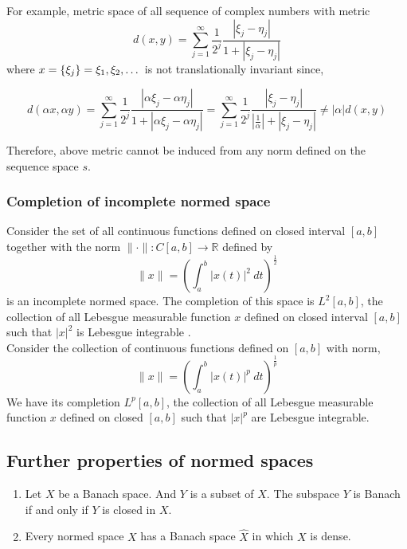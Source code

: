 	For example, metric space of all sequence of complex numbers with metric
	\[ d(x,y) = \sum_{j = 1}^\infty \frac{1}{2^j} \frac{|\xi_j-\eta_j|}{1+|\xi_j-\eta_j|} \]
	where $x = \left\{\xi_j\right\} = \xi_1,\xi_2,\dotsc$ is not translationally invariant since,

	\[ d(\alpha x, \alpha y) = \sum_{j = 1}^\infty \frac{1}{2^j} \frac{|\alpha\xi_j-\alpha\eta_j|}{1+|\alpha\xi_j - \alpha\eta_j|} = \sum_{j=1}^\infty \frac{1}{2^j} \frac{|\xi_j - \eta_j|}{\left|\frac{1}{\alpha}\right|+|\xi_j-\eta_j|} \ne |\alpha| d(x,y) \]

	Therefore, above metric cannot be induced from any norm defined on the sequence space $s$.
	
\subsubsection{Completion of incomplete normed space}
	Consider the set of all continuous functions defined on closed interval $[a,b]$ together with the norm $\| \cdot \| : C[a,b] \to \mathbb{R}$ defined by
	\[ \|x\| = \left( \int_a^b |x(t)|^2\ dt \right)^\frac{1}{2} \]
	is an incomplete normed space.
	The completion of this space is $L^2[a,b]$, the collection of all Lebesgue measurable function $x$ defined on closed interval $[a,b]$ such that $|x|^2$ is Lebesgue integrable .\\

	Consider the collection of continuous functions defined on $[a,b]$ with norm,
	\[ \|x\| = \left( \int_a^b |x(t)|^p\ dt \right)^\frac{1}{p} \]
	We have its completion $L^p[a,b]$, the collection of all Lebesgue measurable function $x$ defined on closed $[a,b]$ such that $|x|^p$ are Lebesgue integrable.

\subsection{Further properties of normed spaces}
\begin{important}
\begin{enumerate}
	\item Let $X$ be a Banach space.
		And $Y$ is a subset of $X$.
		The subspace $Y$ is Banach if and only if $Y$ is closed in $X$.
	\item Every normed space $X$ has a Banach space $\hat{X}$ in which $X$ is dense.
\end{enumerate}
\end{important}

